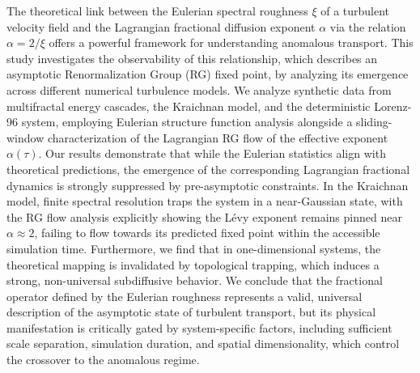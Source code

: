 \documentclass[]{article}
\begin{document}
The theoretical link between the Eulerian spectral roughness $\xi$ of a turbulent velocity field and the Lagrangian fractional diffusion exponent $\alpha$ via the relation $\alpha = 2/\xi$ offers a powerful framework for understanding anomalous transport. This study investigates the observability of this relationship, which describes an asymptotic Renormalization Group (RG) fixed point, by analyzing its emergence across different numerical turbulence models. We analyze synthetic data from multifractal energy cascades, the Kraichnan model, and the deterministic Lorenz-96 system, employing Eulerian structure function analysis alongside a sliding-window characterization of the Lagrangian RG flow of the effective exponent $\alpha(\tau)$. Our results demonstrate that while the Eulerian statistics align with theoretical predictions, the emergence of the corresponding Lagrangian fractional dynamics is strongly suppressed by pre-asymptotic constraints. In the Kraichnan model, finite spectral resolution traps the system in a near-Gaussian state, with the RG flow analysis explicitly showing the Lévy exponent remains pinned near $\alpha \approx 2$, failing to flow towards its predicted fixed point within the accessible simulation time. Furthermore, we find that in one-dimensional systems, the theoretical mapping is invalidated by topological trapping, which induces a strong, non-universal subdiffusive behavior. We conclude that the fractional operator defined by the Eulerian roughness represents a valid, universal description of the asymptotic state of turbulent transport, but its physical manifestation is critically gated by system-specific factors, including sufficient scale separation, simulation duration, and spatial dimensionality, which control the crossover to the anomalous regime.
\end{document}
